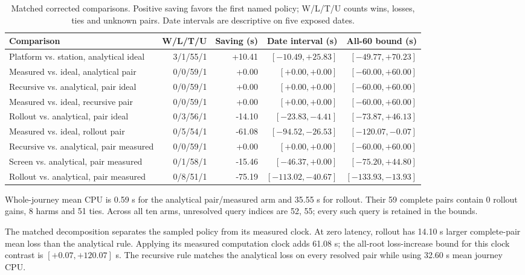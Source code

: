 \begin{table}[ht]
\centering\small\setlength{\tabcolsep}{4pt}
\caption{Matched corrected comparisons. Positive saving favors the first named policy; W/L/T/U counts wins, losses, ties and unknown pairs. Date intervals are descriptive on five exposed dates.}
\begin{tabular}{p{}rrrr}
\toprule
Comparison & W/L/T/U & Saving (s) & Date interval (s) & All-60 bound (s) \\
\midrule
Platform vs. station, analytical ideal & 3/1/55/1 & +10.41 & $[-10.49,+25.83]$ & $[-49.77,+70.23]$ \\
Measured vs. ideal, analytical pair & 0/0/59/1 & +0.00 & $[+0.00,+0.00]$ & $[-60.00,+60.00]$ \\
Recursive vs. analytical, pair ideal & 0/0/59/1 & +0.00 & $[+0.00,+0.00]$ & $[-60.00,+60.00]$ \\
Measured vs. ideal, recursive pair & 0/0/59/1 & +0.00 & $[+0.00,+0.00]$ & $[-60.00,+60.00]$ \\
Rollout vs. analytical, pair ideal & 0/3/56/1 & -14.10 & $[-23.83,-4.41]$ & $[-73.87,+46.13]$ \\
Measured vs. ideal, rollout pair & 0/5/54/1 & -61.08 & $[-94.52,-26.53]$ & $[-120.07,-0.07]$ \\
Recursive vs. analytical, pair measured & 0/0/59/1 & +0.00 & $[+0.00,+0.00]$ & $[-60.00,+60.00]$ \\
Screen vs. analytical, pair measured & 0/1/58/1 & -15.46 & $[-46.37,+0.00]$ & $[-75.20,+44.80]$ \\
Rollout vs. analytical, pair measured & 0/8/51/1 & -75.19 & $[-113.02,-40.67]$ & $[-133.93,-13.93]$ \\
\bottomrule
\end{tabular}
\end{table}

Whole-journey mean CPU is 0.59 s for the analytical pair/measured arm and 35.55 s for rollout. Their 59 complete pairs contain 0 rollout gains, 8 harms and 51 ties. Across all ten arms, unresolved query indices are 52, 55; every such query is retained in the bounds.

The matched decomposition separates the sampled policy from its measured clock. At zero latency, rollout has 14.10 s larger complete-pair mean loss than the analytical rule. Applying its measured computation clock adds 61.08 s; the all-root loss-increase bound for this clock contrast is $[+0.07,+120.07]$ s. The recursive rule matches the analytical loss on every resolved pair while using 32.60 s mean journey CPU.

